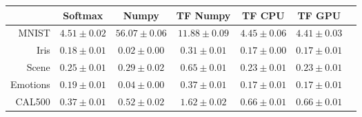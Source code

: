 \begin{tabular}{r|cccccc}
& Softmax & Numpy & TF Numpy & TF CPU & TF GPU \\
\hline
MNIST & $4.51 \pm 0.02$ & $56.07 \pm 0.06$ & $11.88 \pm 0.09$ & $4.45 \pm 0.06$ & $4.41 \pm 0.03$ \\
Iris & $0.18 \pm 0.01$ & $0.02 \pm 0.00$ & $0.31 \pm 0.01$ & $0.17 \pm 0.00$ & $0.17 \pm 0.01$ \\
Scene & $0.25 \pm 0.01$ & $0.29 \pm 0.02$ & $0.65 \pm 0.01$ & $0.23 \pm 0.01$ & $0.23 \pm 0.01$ \\
Emotions & $0.19 \pm 0.01$ & $0.04 \pm 0.00$ & $0.37 \pm 0.01$ & $0.17 \pm 0.01$ & $0.17 \pm 0.01$ \\
CAL500 & $0.37 \pm 0.01$ & $0.52 \pm 0.02$ & $1.62 \pm 0.02$ & $0.66 \pm 0.01$ & $0.66 \pm 0.01$ \\
\end{tabular}
